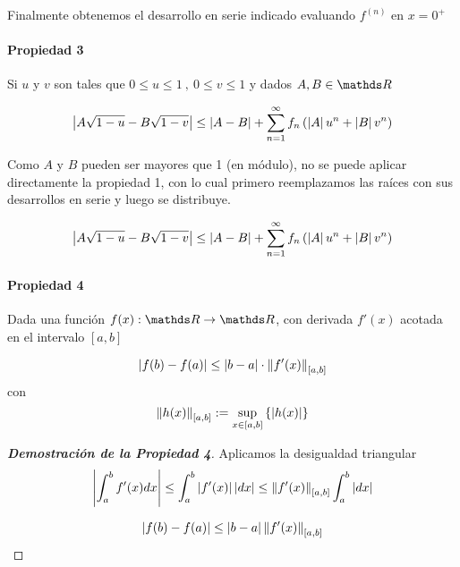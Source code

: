 Finalmente obtenemos el desarrollo en serie indicado evaluando $f^{(n)}$ en $x=0^+$


\paragraph{Propiedad 3} Si $u$ y $v$ son tales que $0 \leq u \leq 1 \ , \ 0 \leq v \leq 1$ y dados $A,B \in \reals$ 

\begin{equation}
    \left|A \sqrt{1-u} - B \sqrt{1-v} \right| \leq \left|A-B\right| + \sum_{n=1}^{\infty} f_n \left(\left|A\right| u^n + \left|B\right| v^n\right)
    \label{eqn:desigtriangconproductoria2}
\end{equation}

Como $A$ y $B$ pueden ser mayores que 1 (en módulo), no se puede aplicar directamente la propiedad 1, con lo cual primero reemplazamos las raíces con sus desarrollos en serie y luego se distribuye.

\begin{equation}
    \left|A \sqrt{1-u} - B \sqrt{1-v} \right| \leq \left|A-B\right| + \sum_{n=1}^{\infty} f_n \left(\left|A\right| u^n + \left|B\right| v^n\right)
    \label{eqn:desigtriangconproductoria3}
\end{equation}



\paragraph{Propiedad 4} Dada una función $f(x): \reals \to \reals$, con derivada $f'(x)$ acotada en el intervalo $[a,b]$

\begin{equation}
    \left|f(b) - f(a)\right| \leq \left|b-a\right|\cdot \left\lVert f'(x)\right\rVert_{[a,b]}
    \label{eqn:derivadavelocidad2}
\end{equation}
con
\begin{equation}
    \left\lVert h(x)\right\rVert_{[a,b]} := \sup_{x\in[a,b]}   \left\{ \left|h(x)\right| \right\}
    \label{eqn:nomab}
\end{equation}

\begin{proof}[\bf{Demostración de la Propiedad 4}]
Aplicamos la desigualdad triangular
\begin{equation}
    \left|\int_a^b f'(x) dx\right| \leq \int_a^b \left|f'(x)\right| \left|dx\right| \leq \left\lVert f'(x)\right\rVert_{[a,b]}\int_a^b\left|dx\right|
    \label{eqn:prop4}
\end{equation}

\begin{equation}
    \left|f(b) - f(a)\right| \leq \left|b-a\right| \left\lVert f'(x)\right\rVert_{[a,b]}
\end{equation}


\end{proof}
\label{prop:5}
